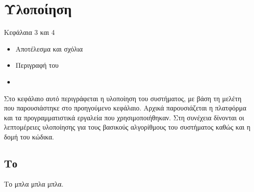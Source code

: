 \chapter{Υλοποίηση}
Κεφάλαια 3 και 4
\begin{itemize}
\item Αποτέλεσμα και σχόλια
\item Περιγραφή του 
\item {}
\end{itemize}
Στο κεφάλαιο αυτό περιγράφεται η υλοποίηση του συστήματος, με βάση
τη μελέτη που παρουσιάστηκε στο προηγούμενο κεφάλαιο. Αρχικά
παρουσιάζεται η πλατφόρμα και τα προγραμματιστικά εργαλεία που
χρησιμοποιήθηκαν. Στη συνέχεια δίνονται οι λεπτομέρειες υλοποίησης
για τους βασικούς αλγορίθμους του συστήματος καθώς και η δομή του
κώδικα.

\section{Το }
Το  μπλα μπλα μπλα.



